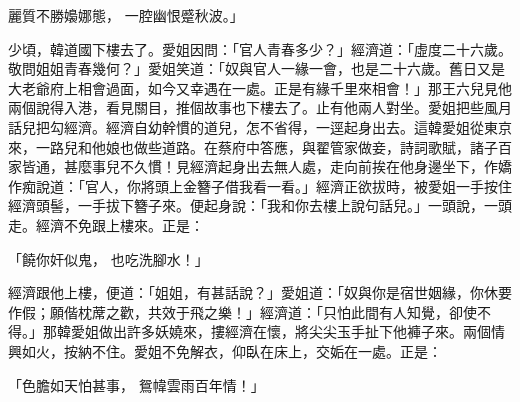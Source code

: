 麗質不勝嬝娜態，  一腔幽恨蹙秋波。」

少頃，韓道國下樓去了。愛姐因問：「官人青春多少？」經濟道：「虛度二十六歲。敬問姐姐青春幾何？」愛姐笑道：「奴與官人一緣一會，也是二十六歲。舊日又是大老爺府上相會過面，如今又幸遇在一處。正是有緣千里來相會！」那王六兒見他兩個說得入港，看見關目，推個故事也下樓去了。止有他兩人對坐。愛姐把些風月話兒把勾經濟。經濟自幼幹慣的道兒，怎不省得，一逕起身出去。這韓愛姐從東京來，一路兒和他娘也做些道路。在蔡府中答應，與翟管家做妾，詩詞歌賦，諸子百家皆通，甚麼事兒不久慣！見經濟起身出去無人處，走向前挨在他身邊坐下，作嬌作痴說道：「官人，你將頭上金簪子借我看一看。」經濟正欲拔時，被愛姐一手按住經濟頭髻，一手拔下簪子來。便起身說：「我和你去樓上說句話兒。」一頭說，一頭走。經濟不免跟上樓來。正是：

「饒你奸似鬼，  也吃洗腳水！」

經濟跟他上樓，便道：「姐姐，有甚話說？」愛姐道：「奴與你是宿世姻緣，你休要作假；願偕枕蓆之歡，共效于飛之樂！」經濟道：「只怕此間有人知覺，卻使不得。」那韓愛姐做出許多妖嬈來，摟經濟在懷，將尖尖玉手扯下他褲子來。兩個情興如火，按納不住。愛姐不免解衣，仰臥在床上，交姤在一處。正是：

「色膽如天怕甚事，  鴛幃雲雨百年情！」

